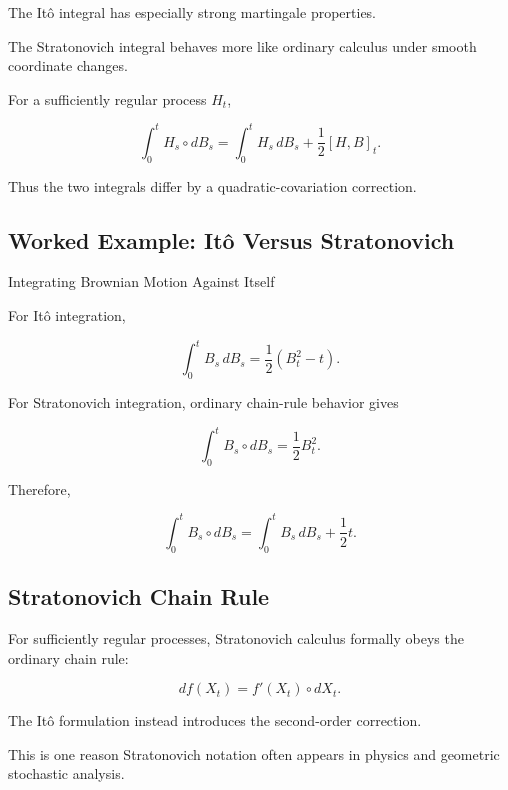 The It\^o integral has especially strong martingale properties.

The Stratonovich integral behaves more like ordinary calculus under
smooth coordinate changes.

For a sufficiently regular process \(H_t\),

\[
\boxed{
\int_0^t
H_s
\circ dB_s
=
\int_0^t
H_s\,dB_s
+
\frac12[H,B]_t.
}
\]

Thus the two integrals differ by a quadratic-covariation correction.

\subsection{Worked Example: It\^o Versus Stratonovich}
\label{subsec:worked-ito-stratonovich}

\begin{workedexamplebox}{Integrating Brownian Motion Against Itself}

For It\^o integration,

\[
\int_0^t
B_s\,dB_s
=
\frac12
(B_t^2-t).
\]

For Stratonovich integration, ordinary chain-rule behavior gives

\[
\int_0^t
B_s\circ dB_s
=
\frac12B_t^2.
\]

Therefore,

\begin{answerbox}
\[
\boxed{
\int_0^t
B_s\circ dB_s
=
\int_0^t
B_s\,dB_s
+
\frac12t.
}
\]
\end{answerbox}

\end{workedexamplebox}

\subsection{Stratonovich Chain Rule}
\label{subsec:stratonovich-chain-rule}

For sufficiently regular processes, Stratonovich calculus formally
obeys the ordinary chain rule:

\[
\boxed{
df(X_t)
=
f'(X_t)
\circ dX_t.
}
\]

The It\^o formulation instead introduces the second-order correction.

This is one reason Stratonovich notation often appears in physics and
geometric stochastic analysis.

